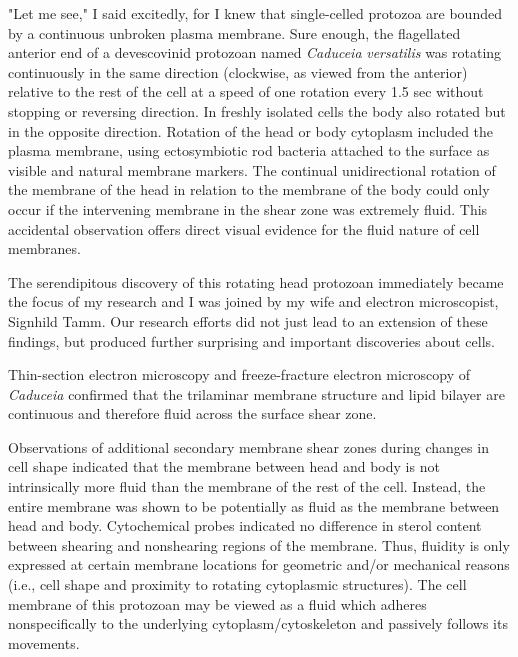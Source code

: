 \documentclass[authordate, editorial]{jote-new-article}
\begin{document}
	"Let me see," I said excitedly, for I knew that single-celled protozoa are bounded by a continuous unbroken plasma membrane. Sure enough, the flagellated anterior end of a devescovinid protozoan named \emph{Caduceia}\emph{ }\emph{versatilis} was rotating continuously in the same direction (clockwise, as viewed from the anterior) relative to the rest of the cell at a speed of one rotation every 1.5 sec without stopping or reversing direction. In freshly isolated cells the body also rotated but in the opposite direction. Rotation of the head or body cytoplasm included the plasma membrane, using ectosymbiotic rod bacteria attached to the surface as visible and natural membrane markers. The continual unidirectional rotation of the membrane of the head in relation to the membrane of the body could only occur if the intervening membrane in the shear zone was extremely fluid. This accidental observation offers direct visual evidence for the fluid nature of cell membranes.







	The serendipitous discovery of this rotating head protozoan immediately became the focus of my research and I was joined by my wife and electron microscopist, Signhild Tamm. Our research efforts did not just lead to an extension of these findings, but produced further surprising and important discoveries about cells.







	Thin-section electron microscopy and freeze-fracture electron microscopy of \emph{Caduceia}\emph{ }confirmed that the trilaminar membrane structure and lipid bilayer are continuous and therefore fluid across the surface shear zone.







	Observations of additional secondary membrane shear zones during changes in cell shape indicated that the membrane between head and body is not intrinsically more fluid than the membrane of the rest of the cell. Instead, the entire membrane was shown to be potentially as fluid as the membrane between head and body. Cytochemical probes indicated no difference in sterol content between shearing and nonshearing regions of the membrane. Thus, fluidity is only expressed at certain membrane locations for geometric and/or mechanical reasons (i.e., cell shape and proximity to rotating cytoplasmic structures). The cell membrane of this protozoan may be viewed as a fluid which adheres nonspecifically to the underlying cytoplasm/cytoskeleton and passively follows its movements.
\end{document}
